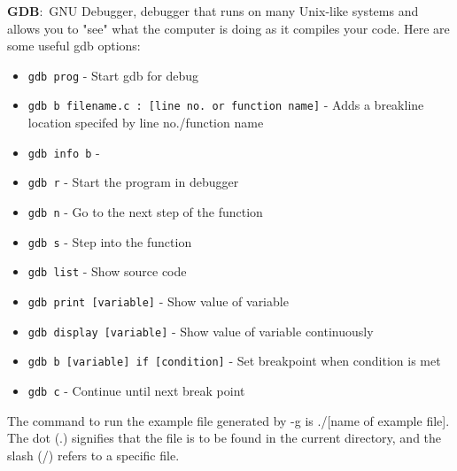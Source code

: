\documentclass[nobib]{tufte-handout}
\newcommand{\defn}[2]{\noindent\textbf{#1}:\ #2}
\begin{document}
\defn{GDB}{GNU Debugger, debugger that runs on many 
Unix-like systems and allows you to "see" what the computer
is doing as it compiles your code.}
Here are some useful gdb options:
\begin{itemize}
   \item \texttt{gdb prog} - Start gdb for debug
   \item \texttt{gdb b filename.c : [line no. or function name]} - Adds a breakline location specifed by line no./function name
   \item \texttt{gdb info b} - 
   \item \texttt{gdb r} - Start the program in debugger
   \item \texttt{gdb n} - Go to the next step of the function
   \item \texttt{gdb s} - Step into the function
   \item \texttt{gdb list} - Show source code
   \item \texttt{gdb print [variable]} - Show value of variable
   \item \texttt{gdb display [variable]} - Show value of variable continuously
   \item \texttt{gdb b [variable] if [condition]} - Set breakpoint when condition is met
   \item \texttt{gdb c} - Continue until next break point
\end{itemize}
The command to run the example file generated by -g is ./[name of example file].
The dot (.) signifies that the file is to be found in the current directory,
and the slash (/) refers to a specific file.
\end{document}
